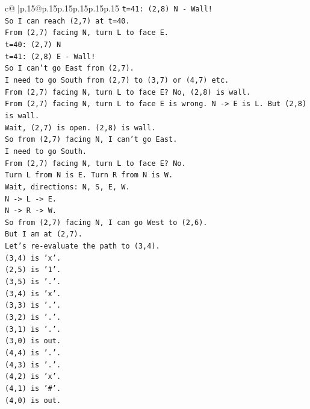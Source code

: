 \documentclass{article}
\begin{document}
{\begin{supertabular}{c@{$\;$}|p{.15\linewidth}@{}p{.15\linewidth}p{.15\linewidth}p{.15\linewidth}p{.15\linewidth}p{.15\linewidth}}
{{{\texttt{t=41: (2,8) N {-} Wall!} \\
\texttt{So I can reach (2,7) at t=40.} \\
\texttt{From (2,7) facing N, turn L to face E.} \\
\texttt{t=40: (2,7) N} \\
\texttt{t=41: (2,8) E {-} Wall!} \\
\texttt{So I can't go East from (2,7).} \\
\texttt{I need to go South from (2,7) to (3,7) or (4,7) etc.} \\
\texttt{From (2,7) facing N, turn L to face E? No, (2,8) is wall.} \\
\texttt{From (2,7) facing N, turn L to face E is wrong. N {-}> E is L. But (2,8) is wall.} \\
\texttt{Wait, (2,7) is open. (2,8) is wall.} \\
\texttt{So from (2,7) facing N, I can't go East.} \\
\texttt{I need to go South.} \\
\texttt{From (2,7) facing N, turn L to face E? No.} \\
\texttt{Turn L from N is E. Turn R from N is W.} \\
\texttt{Wait, directions: N, S, E, W.} \\
\texttt{N {-}> L {-}> E.} \\
\texttt{N {-}> R {-}> W.} \\
\texttt{So from (2,7) facing N, I can go West to (2,6).} \\
\texttt{But I am at (2,7).} \\
\texttt{Let's re{-}evaluate the path to (3,4).} \\
\texttt{(3,4) is 'x'.} \\
\texttt{(2,5) is '1'.} \\
\texttt{(3,5) is '.'.} \\
\texttt{(3,4) is 'x'.} \\
\texttt{(3,3) is '.'.} \\
\texttt{(3,2) is '.'.} \\
\texttt{(3,1) is '.'.} \\
\texttt{(3,0) is out.} \\
\texttt{(4,4) is '.'.} \\
\texttt{(4,3) is '.'.} \\
\texttt{(4,2) is 'x'.} \\
\texttt{(4,1) is '\#'.} \\
\texttt{(4,0) is out.} \\
}}}
\end{supertabular}}
\end{document}
